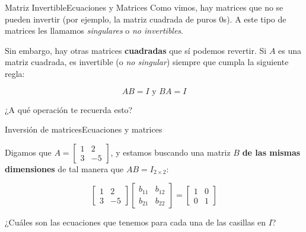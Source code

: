 \documentclass[spanish, c]{beamer}
\begin{document}
\begin{frame}{Matriz Invertible}{Ecuaciones y Matrices}
    Como vimos, hay matrices que no se pueden invertir (por ejemplo, la matriz cuadrada de puros 0s). A este tipo de matrices les llamamos \textit{singulares} o \textit{no invertibles}. \pause

    \bigskip

    Sin embargo, hay otras matrices \textbf{cuadradas} que sí podemos revertir. Si $A$ es una matriz cuadrada, es \alert{invertible} (o \textit{no singular}) siempre que cumpla la siguiente regla: \pause

    \bigskip

    \[AB = I \text{ y } BA = I\]

    \bigskip

    ¿A qué operación te recuerda esto?  

\end{frame}

\begin{frame}{Inversión de matrices}{Ecuaciones y matrices}

    Digamos que $A = \begin{bmatrix*}
        1 & 2 \\ 3 & -5
    \end{bmatrix*}$, y estamos buscando una matriz $B$ \textbf{de las mismas dimensiones} de tal manera que $AB = I_{2 \times 2}$: \pause

    \bigskip

    \[
        \begin{bmatrix*}
            1 & 2 \\
            3 & -5
        \end{bmatrix*}
        \begin{bmatrix*}
            b_{11} & b_{12} \\
            b_{21} & b_{22}
        \end{bmatrix*} =
        \begin{bmatrix*}
            1 & 0 \\ 0 & 1
        \end{bmatrix*}
    \] \pause

    \bigskip

    ¿Cuáles son las ecuaciones que tenemos para cada una de las casillas en $I$?
\end{frame}
\end{document}
